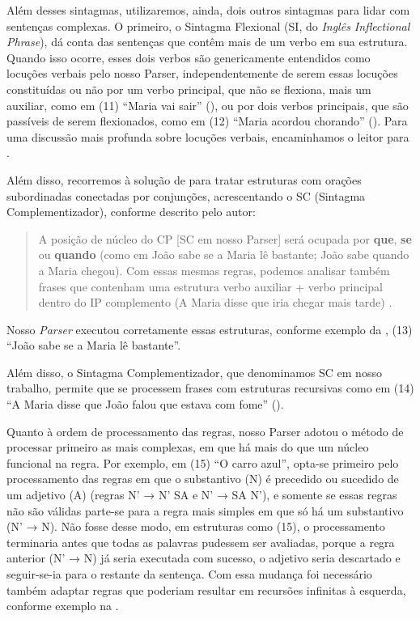 \documentclass[portuguese]{textolivre}
\begin{document}
Além desses sintagmas, utilizaremos, ainda, dois outros sintagmas para lidar com sentenças complexas. O primeiro, o Sintagma Flexional (SI, do \textit{Inglês Inflectional Phrase}), dá conta das sentenças que contêm mais de um verbo em sua estrutura. Quando isso ocorre, esses dois verbos são genericamente entendidos como locuções verbais pelo nosso Parser, independentemente de serem essas locuções constituídas ou não por um verbo principal, que não se flexiona, mais um auxiliar, como em (11) “Maria vai sair” (), ou por dois verbos principais, que são passíveis de serem flexionados, como em (12) “Maria acordou chorando” (). Para uma discussão mais profunda sobre locuções verbais, encaminhamos o leitor para \textcite[p. 126-131]{othero_gramatica_2009}.


Além disso, recorremos à solução de \textcite{othero_gramatica_2009} para tratar estruturas com orações subordinadas conectadas por conjunções, acrescentando o SC (Sintagma Complementizador), conforme descrito pelo autor:

\begin{quote}
    A posição de núcleo do CP [SC em nosso Parser] será ocupada por \textbf{que}, \textbf{se} ou \textbf{quando} (como em João sabe se a Maria lê bastante; João sabe quando a Maria chegou). Com essas mesmas regras, podemos analisar também frases que contenham uma estrutura verbo auxiliar + verbo principal dentro do IP complemento (A Maria disse que iria chegar mais tarde) \cite[p. 139, grifos do autor]{othero_gramatica_2009}.
\end{quote}

Nosso \textit{Parser} executou corretamente essas estruturas, conforme exemplo da , (13) “João sabe se a Maria lê bastante”.



Além disso, o Sintagma Complementizador, que denominamos SC em nosso trabalho, permite que se processem frases com estruturas recursivas como em (14) “A Maria disse que João falou que estava com fome” ().



Quanto à ordem de processamento das regras, nosso Parser adotou o método de processar primeiro as mais complexas, em que há mais do que um núcleo funcional na regra. Por exemplo, em (15) “O carro azul”, opta-se primeiro pelo processamento das regras em que o substantivo (N) é precedido ou sucedido de um adjetivo (A) (regras N’ → N’ SA e N’ → SA N’), e somente se essas regras não são válidas parte-se para a regra mais simples em que só há um substantivo (N’ → N). Não fosse desse modo, em estruturas como (15), o processamento terminaria antes que todas as palavras pudessem ser avaliadas, porque a regra anterior (N’ → N) já seria executada com sucesso, o adjetivo seria descartado e seguir-se-ia para o restante da sentença. Com essa mudança foi necessário também adaptar regras que poderiam resultar em recursões infinitas à esquerda, conforme exemplo na .
\end{document}
